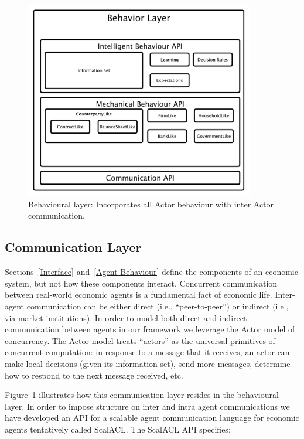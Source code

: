 \documentclass[a4paper]{article}
\begin{document}
\begin{figure}[H]
\centering
\includegraphics[width=10cm]{img/behavior-layer.pdf}
\caption{Behavioural layer: Incorporates all Actor behaviour with inter Actor communication.}
\label{fig:BehaviouralLayer}
\end{figure}

\subsection{Communication Layer}
\label{CommunicationLayer}

Sections~\ref{Interface} and~\ref{Agent Behaviour} define the components of an economic system, but not how these components interact. Concurrent communication between real-world economic agents is a fundamental fact of economic life. Inter-agent communication can be either direct (i.e., ``peer-to-peer'') or indirect (i.e., via market institutions). In order to model both direct and indirect communication between agents in our framework we leverage the \href{https://en.wikipedia.org/wiki/Actor_model}{Actor model} of concurrency. The Actor model treats ``actors'' as the universal primitives of concurrent computation: in response to a message that it receives, an actor can make local decisions (given its information set), send more messages, determine how to respond to the next message received, etc.

Figure~\ref{fig:BehaviouralLayer} illustrates how this communication layer resides in the behavioural layer. In order to impose structure on inter and intra agent communications we have developed an API for a scalable agent communication language for economic agents tentatively called ScalACL. The ScalACL API specifies:
\end{document}
